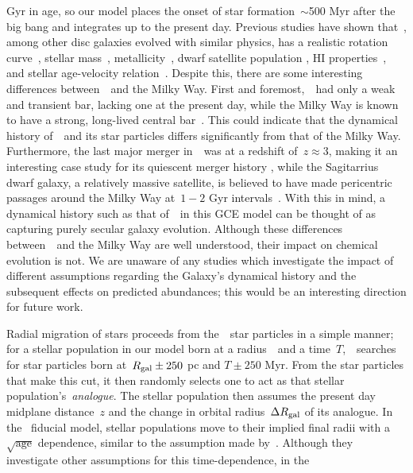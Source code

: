 \documentclass[ms.tex]{subfiles}
\begin{document}
Gyr in age, so our model places the onset of star formation~$\sim$500 Myr
after the big bang and integrates up to the present day.
Previous studies have shown that~\hsim, among other disc galaxies evolved with
similar physics, has a realistic rotation curve~\citep{Governato2012,
Christensen2014a, Christensen2014b}, stellar mass~\citep{Munshi2013},
metallicity~\citep{Christensen2016}, dwarf satellite population
\citep{Zolotov2012, Brooks2014}, HI properties~\citep{Brooks2017}, and stellar
age-velocity relation~\citep{Bird2021}.
Despite this, there are some interesting differences between~\hsim~and the
Milky Way.
First and foremost,~\hsim~had only a weak and transient bar, lacking one at the
present day, while the Milky Way is known to have a strong, long-lived central
bar~\citep[e.g.][]{Bovy2019}.
This could indicate that the dynamical history of~\hsim~and its star particles
differs significantly from that of the Milky Way.
Furthermore, the last major merger in~\hsim~was at a redshift of~$z \approx 3$,
making it an interesting case study for its quiescent merger history
\citep[e.g.][]{Zolotov2012}, while the Sagitarrius dwarf galaxy, a relatively
massive satellite, is believed to have made pericentric passages around the
Milky Way at~$1 - 2$ Gyr intervals~\citep{Law2010}.
With this in mind, a dynamical history such as that of~\hsim~in this GCE model
can be thought of as capturing purely secular galaxy evolution.
Although these differences between~\hsim~and the Milky Way are well understood,
their impact on chemical evolution is not.
We are unaware of any studies which investigate the impact of different
assumptions regarding the Galaxy's dynamical history and the subsequent effects
on predicted abundances; this would be an interesting direction for future work.
\par
Radial migration of stars proceeds from the~\hsim~star particles in a simple
manner; for a stellar population in our model born at a radius~\rgal~and a
time~$T$,~\vice~searches for star particles born at~$R_\text{gal} \pm 250$ pc and
$T \pm 250$ Myr.
From the star particles that make this cut, it then randomly selects one to act
as that stellar population's~\textit{analogue}.
The stellar population then assumes the present day midplane distance~$z$ and
the change in orbital radius~$\Delta R_\text{gal}$ of its analogue.
In the~\citet{Johnson2021} fiducial model, stellar populations move to their
implied final radii with a~$\sqrt{\text{age}}$ dependence, similar to the
assumption made by~\citet{Frankel2018, Frankel2019}.
Although they investigate other assumptions for this time-dependence, in the
\end{document}
